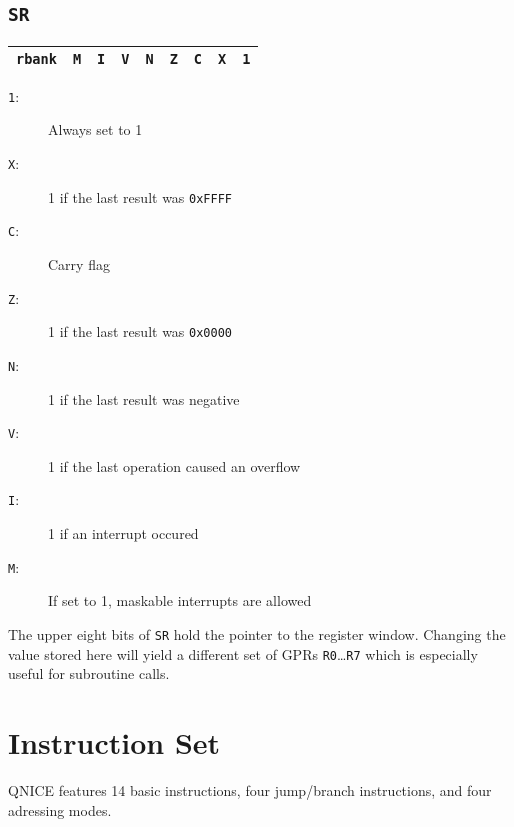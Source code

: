 \documentclass{leaflet}
\begin{document}
  \subsection{\texttt{SR}}
   \begin{center}
    \begin{longtable}{|c||c|c|c|c|c|c|c|c|}
     \hline
     {\tt rbank}&
     {\tt M}&{\tt I}&{\tt V}&{\tt N}&{\tt Z}&{\tt C}&{\tt X}&{\tt 1}\\
     \hline
    \end{longtable}
   \end{center}
    \begin{description}
     \item [{\tt 1}:] Always set to 1
     \item [{\tt X}:] 1 if the last result was {\tt 0xFFFF}
     \item [{\tt C}:] Carry flag
     \item [{\tt Z}:] 1 if the last result was {\tt 0x0000}
     \item [{\tt N}:] 1 if the last result was negative
     \item [{\tt V}:] 1 if the last operation caused an overflow
     \item [{\tt I}:] 1 if an interrupt occured
     \item [{\tt M}:] If set to 1, maskable interrupts are allowed
    \end{description}
    The upper eight bits of \texttt{SR} hold the pointer to the register
    window. Changing the value stored here will yield a different set of 
    GPRs \texttt{R0}\dots\texttt{R7} which is especially useful for subroutine
    calls.
%
 \section{Instruction Set}
  QNICE features 14 basic instructions, four jump/branch instructions, and 
  four adressing modes.
%
\end{document}
